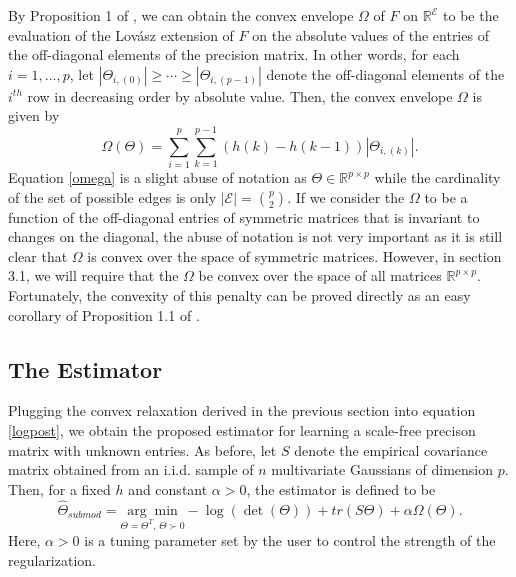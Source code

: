 \documentclass{uwstat572}
\theoremstyle{remark}
\theoremstyle{definition}
\begin{document}
By Proposition 1 of \cite{bach2010}, we can obtain the convex envelope $\Omega$ of $F$ on $\mathbb{R}^{\mathcal{E}}$ to be the evaluation of the Lov{\'a}sz extension of $F$ on the absolute values of the entries of the off-diagonal elements of the precision matrix.  In other words, for each $i = 1,...,p$,  let $|\Theta_{i,(0)}| \geq \cdots \geq |\Theta_{i,(p-1)}|$ denote the off-diagonal elements of the $i^{th}$ row in decreasing order by absolute value.  Then, the convex envelope $\Omega$ is given by
\begin{equation}\label{omega}
\Omega(\Theta) = \sum_{i=1}^p \sum_{k=1}^{p-1} (h(k) - h(k-1)) | \Theta_{i,(k)}|.
\end{equation}
Equation \eqref{omega} is a slight abuse of notation as $\Theta \in \mathbb{R}^{p \times p}$ while the cardinality of the set of possible edges is only $|\mathcal{E}| = \binom{p}{2}$.  If we consider the $\Omega$ to be a function of the off-diagonal entries of symmetric matrices that is invariant to changes on the diagonal, the abuse of notation is not very important as it is still clear that $\Omega$ is convex over the space of symmetric matrices.  However, in section 3.1, we will require that the $\Omega$ be convex over the space of all matrices $\mathbb{R}^{p \times p}$. Fortunately, the convexity of this penalty can be proved directly as an easy corollary of Proposition 1.1 of \cite{bogdan2013statistical} .  


\subsection{The Estimator}

Plugging the convex relaxation derived in the previous section into equation \eqref{logpost}, we obtain the proposed estimator for learning a scale-free precison matrix with unknown entries.  As before, let $S$ denote the empirical covariance matrix obtained from an i.i.d. sample of $n$ multivariate Gaussians of dimension $p$.  Then, for a fixed $h$ and constant $\alpha > 0$, the estimator is defined to be
\begin{equation}\label{estimator}
\widehat{\Theta}_{submod} = \underset{\Theta = \Theta^T, \, \Theta \succ 0}{\arg \min} - \log(\det(\Theta)) + tr(S \Theta) + \alpha \Omega(\Theta).
\end{equation}
Here, $\alpha > 0$ is a tuning parameter set by the user to control the strength of the regularization.  
\end{document}
